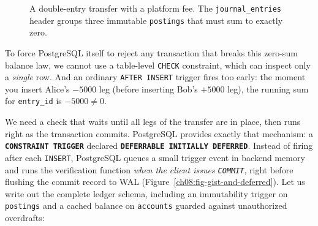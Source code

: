 \begin{figure}[htbp]
\centering
{}
\caption{A double-entry transfer with a platform fee. The \texttt{journal\_entries} header groups three immutable \texttt{postings} that must sum to exactly zero.}
\label{fig:ch08-double-entry}
\end{figure}

To force PostgreSQL itself to reject any transaction that breaks this
zero-sum balance law, we cannot use a table-level \texttt{CHECK} constraint, which can inspect only a
\emph{single} row. And an ordinary \texttt{AFTER INSERT} trigger fires too early:
the moment you insert Alice's $-5000$ leg (before inserting Bob's $+5000$ leg), the
running sum for \texttt{entry\_id} is $-5000 \ne 0$.

We need a check that waits until all legs of the transfer are in place,
then runs right as the transaction commits. PostgreSQL provides exactly that
mechanism: a \textbf{\texttt{CONSTRAINT TRIGGER}} declared
\textbf{\texttt{DEFERRABLE INITIALLY DEFERRED}}. Instead of firing after each
\texttt{INSERT}, PostgreSQL queues a small trigger event in backend memory and runs
the verification function \emph{when the client issues \texttt{COMMIT}}, right
before flushing the commit record to WAL (Figure~\ref{ch08:fig-gist-and-deferred}).
Let us write out the complete ledger schema, including an immutability trigger on
\texttt{postings} and a cached balance on \texttt{accounts} guarded against
unauthorized overdrafts:

